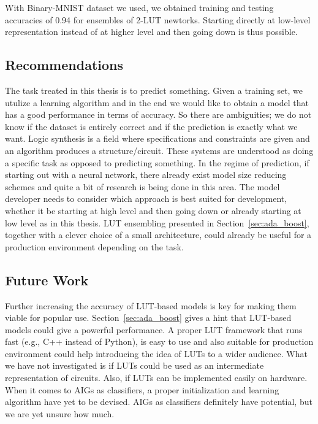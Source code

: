 With Binary-MNIST dataset we used, we obtained training and testing accuracies of 0.94 for ensembles of 2-LUT newtorks. Starting directly at low-level representation instead of at higher level and then going down is thus possible.

\subsection{Recommendations}
The task treated in this thesis is to predict something. Given a training set, we utulize a learning algorithm and in the end we would like to obtain a model that has a good performance in terms of accuracy. So there are ambiguities; we do not know if the dataset is entirely correct and if the prediction is exactly what we want. Logic synthesis \cite{bib:logic_synthesis_wiki} is a field where specifications and constraints are given and an algorithm produces a structure/circuit. These systems are understood as doing a specific task as opposed to predicting something. In the regime of prediction, if starting out with a neural network, there already exist model size reducing schemes \cite{bib:liu2021bringing} and quite a bit of research is being done in this area. The model developer needs to consider which approach is best suited for development, whether it be starting at high level and then going down or already starting at low level as in this thesis. LUT ensembling presented in Section~\ref{sec:ada_boost}, together with a clever choice of a small architecture, could already be useful for a production environment depending on the task.

\subsection{Future Work}
Further increasing the accuracy of LUT-based models is key for making them viable for popular use. Section~\ref{sec:ada_boost} gives a hint that LUT-based models could give a powerful performance. A proper LUT framework that runs fast (e.g., C++ instead of Python), is easy to use and also suitable for production environment could help introducing the idea of LUTs to a wider audience. What we have not investigated is if LUTs could be used as an intermediate representation of circuits. Also, if LUTs can be implemented easily on hardware. When it comes to AIGs as classifiers, a proper initialization and learning algorithm have yet to be devised. AIGs as classifiers definitely have potential, but we are yet unsure how much.
